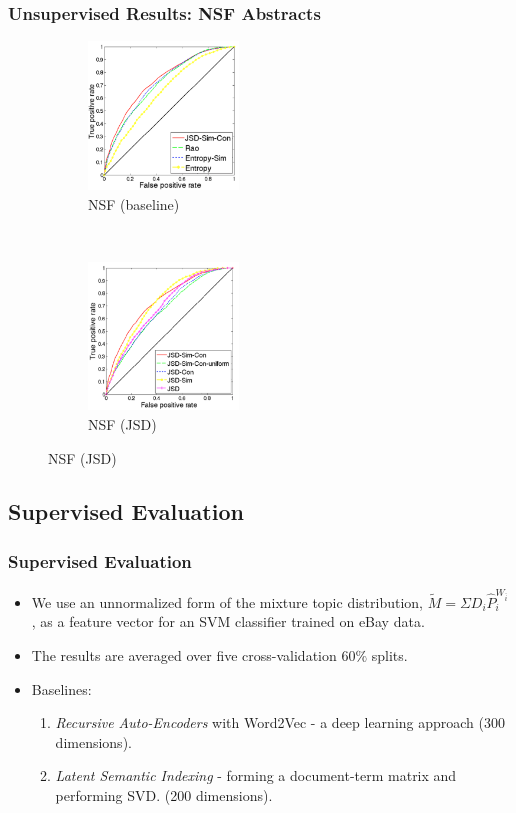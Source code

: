 \documentclass{beamer}
\begin{document}
\begin{frame}
\frametitle{Unsupervised Results: NSF Abstracts}
\begin{figure}
        \begin{subfigure}[b]{0.45\textwidth}
                \centering
                \includegraphics[width=40mm]{figures/nsf-comparison-kopia.png}
                \caption{NSF (baseline)}
                \label{fig:nsf-comparison}
        \end{subfigure}%
        ~ %
        \begin{subfigure}[b]{0.45\textwidth}
        	        \centering
                \includegraphics[width=40mm]{figures/nsf-breakdown-kopia.png}
               \caption{NSF (JSD)}
                \label{fig:nsf-breakdown}
        \end{subfigure}
\end{figure}
\end{frame}

\subsection{Supervised Evaluation}

\begin{frame}
\frametitle{Supervised Evaluation}
\begin{itemize}
\item We use an unnormalized form of the mixture topic distribution,
  $\tilde{M}=\Sigma D_i\hat{P}_i^{W_{\bar{i}}}$, as a feature vector
  for an SVM classifier trained on eBay data.
\item The results are averaged over five cross-validation $60\%$
  splits.
\item Baselines:
\begin{enumerate}
\item {\em Recursive Auto-Encoders} with Word2Vec - a deep learning approach
  (300 dimensions).
\item {\em Latent Semantic Indexing} - forming a document-term matrix
  and performing SVD. (200 dimensions).
\end{enumerate}
\end{itemize}
\end{frame}
\end{document}
